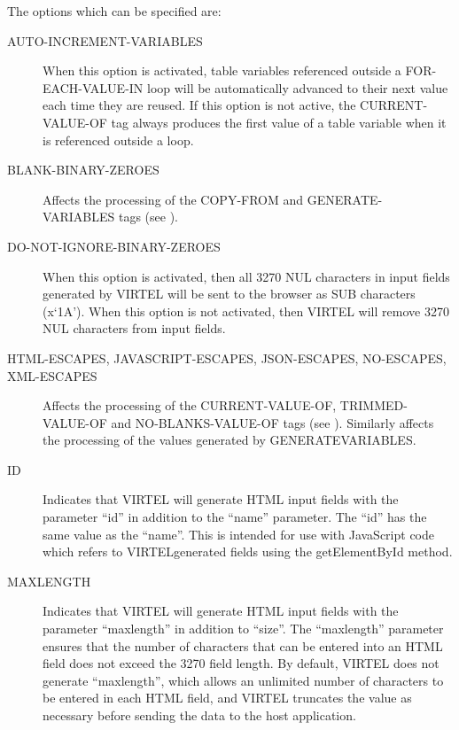 \documentclass[letterpaper,10pt,english]{sphinxmanual}
\begin{document}
The options which can be specified are:
\begin{description}
\item[{AUTO-INCREMENT-VARIABLES}] \leavevmode
When this option is activated, table variables referenced outside a FOR-EACH-VALUE-IN loop will be automatically advanced to their next value each time they are reused. If this option is not active, the CURRENT-VALUE-OF tag always produces the first value of a table variable when it is referenced outside a loop.

\item[{BLANK-BINARY-ZEROES}] \leavevmode
Affects the processing of the COPY-FROM and GENERATE-VARIABLES tags (see {\hyperref[\detokenize{User_Guide:v457ug-inserting-host-data}]{}}).

\item[{DO-NOT-IGNORE-BINARY-ZEROES}] \leavevmode
When this option is activated, then all 3270 NUL characters in input fields generated by VIRTEL will be sent to the browser as SUB characters (x‘1A’). When this option is not activated, then VIRTEL will remove 3270 NUL characters from input fields.

\item[{HTML-ESCAPES, JAVASCRIPT-ESCAPES, JSON-ESCAPES, NO-ESCAPES, XML-ESCAPES}] \leavevmode
Affects the processing of the CURRENT-VALUE-OF, TRIMMED-VALUE-OF and NO-BLANKS-VALUE-OF tags (see {\hyperref[\detokenize{User_Guide:v457ug-table-variables}]{}}). Similarly affects the processing of the values generated by GENERATEVARIABLES.

\item[{ID}] \leavevmode
Indicates that VIRTEL will generate HTML input fields with the parameter “id” in addition to the “name” parameter. The “id” has the same value as the “name”. This is intended for use with JavaScript code which refers to VIRTELgenerated fields using the getElementById method.

\item[{MAXLENGTH}] \leavevmode
Indicates that VIRTEL will generate HTML input fields with the parameter “maxlength” in addition to “size”. The “maxlength” parameter ensures that the number of characters that can be entered into an HTML field does not exceed the 3270 field length. By default, VIRTEL does not generate “maxlength”, which allows an unlimited number of characters to be entered in each HTML field, and VIRTEL truncates the value as necessary before sending the data to the host application.


\end{description}
\end{document}
